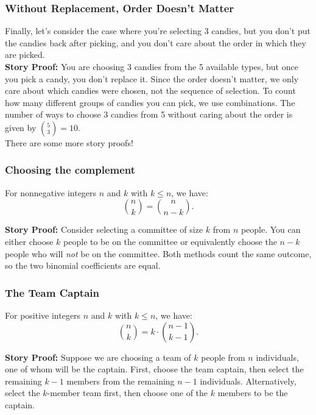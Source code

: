 \subsubsection*{Without Replacement, Order Doesn't Matter}

Finally, let’s consider the case where you’re selecting 3 candies, but you don’t put the candies back after picking, and you don’t care about the order in which they are picked.\\

\textbf{Story Proof:} You are choosing 3 candies from the 5 available types, but once you pick a candy, you don't replace it. Since the order doesn’t matter, we only care about which candies were chosen, not the sequence of selection. To count how many different groups of candies you can pick, we use combinations. The number of ways to choose 3 candies from 5 without caring about the order is given by \( \binom{5}{3} = 10 \). \\

There are some more story proofs!

\subsubsection{Choosing the complement}

For nonnegative integers \(n\) and \(k\) with \(k \leq n\), we have:
\[
\binom{n}{k} = \binom{n}{n-k}.
\]

\textbf{Story Proof:} Consider selecting a committee of size \(k\) from \(n\) people. You can either choose \(k\) people to be on the committee or equivalently choose the \(n-k\) people who will \textit{not} be on the committee. Both methods count the same outcome, so the two binomial coefficients are equal.

\subsubsection{The Team Captain}

For positive integers \(n\) and \(k\) with \(k \leq n\), we have:
\[
\binom{n}{k} = k \cdot \binom{n-1}{k-1}.
\]

\textbf{Story Proof:} Suppose we are choosing a team of \(k\) people from \(n\) individuals, one of whom will be the captain. First, choose the team captain, then select the remaining \(k-1\) members from the remaining \(n-1\) individuals. Alternatively, select the \(k\)-member team first, then choose one of the \(k\) members to be the captain.

